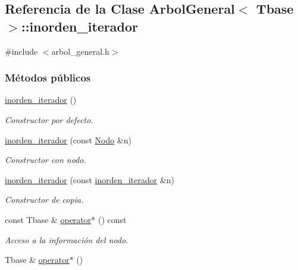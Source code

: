 \hypertarget{classArbolGeneral_1_1inorden__iterador}{}\subsection{Referencia de la Clase Arbol\+General$<$ Tbase $>$\+:\+:inorden\+\_\+iterador}
\label{classArbolGeneral_1_1inorden__iterador}


{\ttfamily \#include $<$arbol\+\_\+general.\+h$>$}

\subsubsection*{Métodos públicos}
\begin{DoxyCompactItemize}
\item 
\hyperlink{classArbolGeneral_1_1inorden__iterador_aff58cfa3f1c33c0c9c8c08f1d0f3cc8f}{inorden\+\_\+iterador} ()
\begin{DoxyCompactList}\small\item\em Constructor por defecto. \end{DoxyCompactList}\item 
\hyperlink{classArbolGeneral_1_1inorden__iterador_a6ddfc67535be2870b508633b75639698}{inorden\+\_\+iterador} (const \hyperlink{classArbolGeneral_a12cc1b74a9095d89bc7334290d332f7a}{Nodo} \&n)
\begin{DoxyCompactList}\small\item\em Constructor con nodo. \end{DoxyCompactList}\item 
\hyperlink{classArbolGeneral_1_1inorden__iterador_a35353196b9e723891d499a54ac19f8de}{inorden\+\_\+iterador} (const \hyperlink{classArbolGeneral_1_1inorden__iterador}{inorden\+\_\+iterador} \&n)
\begin{DoxyCompactList}\small\item\em Constructor de copia. \end{DoxyCompactList}\item 
const Tbase \& \hyperlink{classArbolGeneral_1_1inorden__iterador_a170f4e8b9dbc9694cee3e22cebf17035}{operator$\ast$} () const
\begin{DoxyCompactList}\small\item\em Acceso a la información del nodo. \end{DoxyCompactList}\item 
Tbase \& \hyperlink{classArbolGeneral_1_1inorden__iterador_a566d603aa2bbca6c429031785497b116}{operator$\ast$} ()

\end{DoxyCompactItemize}
